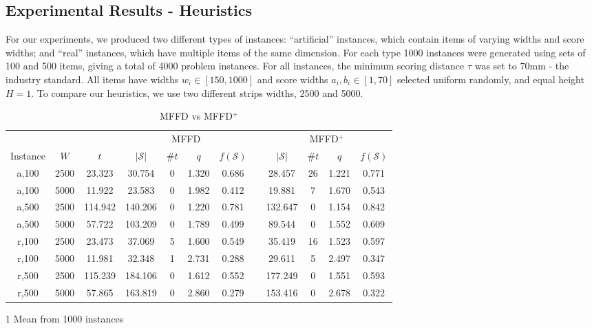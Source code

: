 \documentclass{elsarticle}
\begin{document}
\subsection{Experimental Results - Heuristics}
\label{sub:expheuristics}
For our experiments, we produced two different types of instances: ``artificial'' instances, which contain items of varying widths and score widths; and ``real'' instances, which have multiple items of the same dimension. For each type 1000 instances were generated using sets of 100 and 500 items, giving a total of 4000 problem instances. For all instances, the minimum scoring distance $\tau$ was set to 70mm - the industry standard. All items have widths $w_i \in [150,1000]$ and score widths $a_i, b_i \in [1,70]$ selected uniform randomly, and equal height $H=1$. To compare our heuristics, we use two different strips widths, 2500 and 5000.

\begin{table}[h!]
	\centering
\caption{MFFD vs MFFD$^+$}
\begin{threeparttable}
\begin{tabular}{cccccccccccc}\toprule
	& & & \multicolumn{4}{c}{MFFD} &\phantom{a}& \multicolumn{4}{c}{MFFD$^+$}\\
	\cmidrule{4-7} \cmidrule{9-12}
	Instance & $W$ & $t$ & $|\mathcal{S}|$\tnote{1} & $\# t$ & $q$ & $f(\mathcal{S})$ && $|\mathcal{S}|$ & $\# t$ & $q$ & $f(\mathcal{S})$\\ \midrule	
	a,100 & 2500 & 23.323 & 30.754 & 0 & 1.320 & 0.686 && 28.457 & 26 & 1.221 & 0.771 \\
	a,100 & 5000 & 11.922 & 23.583 & 0 & 1.982 & 0.412 && 19.881 & 7 & 1.670 & 0.543  \\
	\midrule
	a,500 & 2500 & 114.942 & 140.206 & 0 & 1.220 & 0.781 && 132.647 & 0 & 1.154 & 0.842 \\
	a,500 & 5000 & 57.722 & 103.209 & 0 & 1.789 & 0.499 && 89.544 & 0 & 1.552 & 0.609 \\
	\midrule
	\midrule
	r,100 & 2500 & 23.473 & 37.069 & 5 & 1.600 & 0.549 && 35.419 & 16 & 1.523 & 0.597 \\
	r,100 & 5000 & 11.981 & 32.348 & 1 & 2.731 & 0.288 && 29.611 & 5 & 2.497 & 0.347 \\
	\midrule
	r,500 & 2500 & 115.239 & 184.106 & 0 & 1.612 & 0.552 && 177.249 & 0 & 1.551 & 0.593 \\
	r,500 & 5000 & 57.865 & 163.819 & 0 & 2.860 & 0.279 && 153.416 & 0 & 2.678 & 0.322 \\
	\bottomrule
\end{tabular}
\begin{tablenotes}
	\item[1] Mean from 1000 instances
\end{tablenotes}	
\end{threeparttable}	
\label{table:MFFD}
\end{table}
\end{document}

